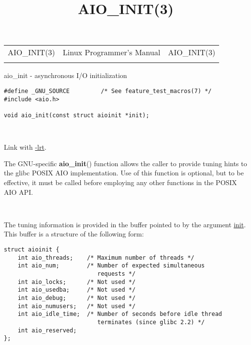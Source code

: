 \documentclass[]{article}
\title{AIO\_INIT(3)}
\author{}
\date{}
\let\realtextbf=\textbf
\renewcommand{\textbf}[1]{\textcolor{boldcolor}{\realtextbf{#1}}}
\renewcommand{\emph}[1]{\underline{#1}}
\begin{document}
\maketitle

\begin{longtable}[c]{@{}lll@{}}
\toprule\addlinespace
AIO\_INIT(3) & Linux Programmer's Manual & AIO\_INIT(3)
\\\addlinespace
\bottomrule
\end{longtable}


aio\_init - asynchronous I/O initialization


\begin{verbatim}
#define _GNU_SOURCE         /* See feature_test_macros(7) */
#include <aio.h>

void aio_init(const struct aioinit *init);
\end{verbatim}

~

Link with \emph{-lrt}.


The GNU-specific \textbf{aio\_init}() function allows the caller to
provide tuning hints to the glibc POSIX AIO implementation. Use of this
function is optional, but to be effective, it must be called before
employing any other functions in the POSIX AIO API.

~

The tuning information is provided in the buffer pointed to by the
argument \emph{init}. This buffer is a structure of the following form:

\begin{verbatim}
struct aioinit {
    int aio_threads;    /* Maximum number of threads */
    int aio_num;        /* Number of expected simultaneous
                           requests */
    int aio_locks;      /* Not used */
    int aio_usedba;     /* Not used */
    int aio_debug;      /* Not used */
    int aio_numusers;   /* Not used */
    int aio_idle_time;  /* Number of seconds before idle thread
                           terminates (since glibc 2.2) */
    int aio_reserved;
};
\end{verbatim}
\end{document}
